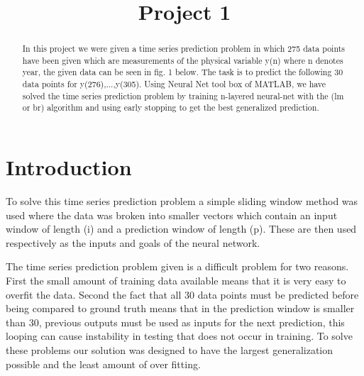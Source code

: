 \documentclass[conference]{IEEEtran}
\begin{document}
\title{Project 1}

\author{
	\and
{}
\and	
{}
	
	
}


\maketitle


\begin{abstract}
In this project we were given a time series prediction problem in which 275 data points have been given which are measurements of the physical variable y(n) where n denotes year, the given data can be seen in fig. 1 below. The task is to predict the following 30 data points for y(276),...,y(305). Using Neural Net tool box of MATLAB, we have solved the time series prediction problem by training n-layered neural-net with the (lm or br) algorithm and using early stopping to get the best generalized prediction.
\end{abstract}

\section{Introduction}
To solve this time series prediction problem a simple sliding window method was used where the data was broken into smaller vectors which contain an input window of length (i) and a prediction window of length (p). These are then used respectively as the inputs and goals of the neural network.

The time series prediction problem given is a difficult problem for two reasons. First the small amount of training data available means that it is very easy to overfit the data. Second the fact that all 30 data points must be predicted before being compared to ground truth means that in the prediction window is smaller than 30, previous outputs must be used as inputs for the next prediction, this looping can cause instability in testing that does not occur in training. To solve these problems our solution was designed to have the largest generalization possible and the least amount of over fitting.
\end{document}
